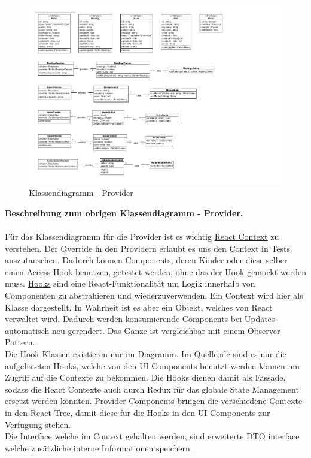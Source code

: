 \begin{figure}[H]
	\hspace{-3cm}
	\includegraphics[scale = 0.9]{./img/Diagrams/providers-classDiagram}
	\caption{Klassendiagramm - Provider}
\end{figure}
\newpage

\textbf{Beschreibung zum obrigen Klassendiagramm - Provider.} \\ \\
Für das Klassendiagramm für die Provider ist es wichtig \href{https://reactjs.org/docs/context.html}{React Context} zu verstehen.  Der Override in den Providern erlaubt es uns den Context in Tests auszutauschen. Dadurch können Components, deren Kinder oder diese selber einen Access Hook  benutzen, 
getestet werden, ohne das der Hook gemockt werden muss. \href{https://reactjs.org/docs/hooks-intro.html}{Hooks} sind eine React-Funktionalität um Logik innerhalb von Componenten zu abstrahieren und wiederzuverwenden. Ein Context wird hier als Klasse dargestellt. In Wahrheit ist es aber ein Objekt, 
welches von React verwaltet wird. Dadurch werden konsumierende Components bei Updates automatisch neu gerendert. Das Ganze ist vergleichbar mit einem Observer Pattern. \\
Die Hook Klassen existieren nur im Diagramm. Im Quellcode sind es nur die aufgelisteten Hooks, welche von den UI Components benutzt werden können um Zugriff auf die Contexte zu bekommen. Die Hooks dienen damit als Fassade, sodass die React Contexte auch durch Redux für das globale State Management ersetzt werden könnten.
Provider Components bringen die verschiedene Contexte in den React-Tree, damit diese für die Hooks in den UI Components zur Verfügung stehen.\\
Die Interface welche im Context gehalten werden, sind erweiterte DTO interface welche zusätzliche interne Informationen speichern.

